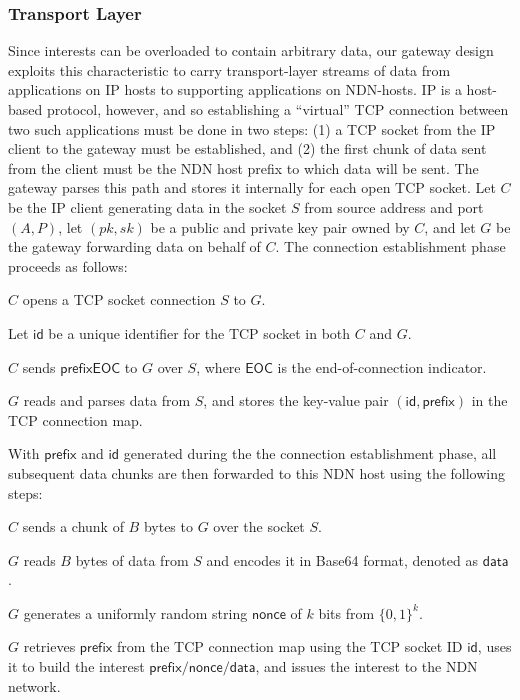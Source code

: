 \subsubsection{Transport Layer} %
Since interests can be overloaded to contain arbitrary data, our gateway design exploits this characteristic to carry transport-layer streams of data from applications on IP hosts to supporting applications on NDN-hosts. IP is a host-based protocol, however, and so establishing a ``virtual'' TCP connection between two such applications must be done in two steps: (1) a TCP socket from the IP client to the gateway must be established, and (2) the first chunk of data sent from the client must be the NDN host prefix to which data will be sent. The gateway parses this path and stores it internally for each open TCP socket. Let $C$ be the IP client generating data in the socket $S$ from source address and port $(A, P)$, let $(pk,sk)$ be a public and private key pair owned by $C$, and let $G$ be the gateway forwarding data on behalf of $C$. The connection establishment phase proceeds as follows:
%
\begin{compactenum}
	\item $C$ opens a TCP socket connection $S$ to $G$. \item Let $\mathsf{id}$ be a unique identifier for the TCP socket in both $C$ and $G$.
	\item $C$ sends $\mathsf{prefix}\mathsf{EOC}$ to $G$ over $S$, where $\mathsf{EOC}$ is the end-of-connection indicator.
	\item $G$ reads and parses data from $S$, and stores the key-value pair $(\mathsf{id}, \mathsf{prefix})$ in the TCP connection map.
\end{compactenum}
%
With $\mathsf{prefix}$ and $\mathsf{id}$ generated during the the connection establishment phase, all subsequent data chunks are then forwarded to this NDN host using the following steps:
%
\begin{compactenum}
	\item $C$ sends a chunk of $B$ bytes to $G$ over the socket $S$.
	\item $G$ reads $B$ bytes of data from $S$ and encodes it in Base64 format, denoted as $\mathsf{data}$.
	\item $G$ generates a uniformly random string $\mathsf{nonce}$ of $k$ bits from $\{0,1\}^k$. 
	\item $G$ retrieves $\mathsf{prefix}$ from the TCP connection map using the TCP socket ID $\mathsf{id}$, uses it to build the interest $\mathsf{prefix}/\mathsf{nonce}/\mathsf{data}$, and issues the interest to the NDN network.
\end{compactenum}
